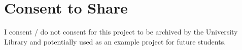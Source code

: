 \section*{Consent to Share}
I consent / do not consent for this project to be archived by the University
Library and potentially used as an example project for future students.
